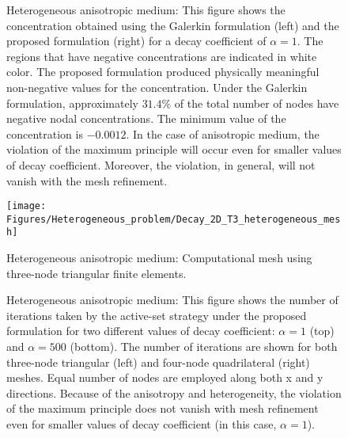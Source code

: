 \documentclass[11pt]{amsart}
\begin{document}
\clearpage
\newpage

\begin{figure}[htbp]
  \centering
\caption{Heterogeneous anisotropic medium: This figure shows the concentration obtained 
      using the Galerkin formulation (left) and the proposed formulation (right) for a decay 
      coefficient of $\alpha = 1$. The regions that have negative concentrations are indicated 
      in white color. The proposed formulation produced physically meaningful non-negative 
      values for the concentration. Under the Galerkin formulation, approximately $31.4\%$ 
      of the total number of nodes have negative nodal concentrations. The minimum value of 
      the concentration is $-0.0012$. In the case of anisotropic medium, the violation 
      of the maximum principle will occur even for smaller values of decay coefficient. 
      Moreover, the violation, in general, will not vanish with the mesh refinement.} 
    \label{Fig:Decay_2D_T3_heterogeneous}
\end{figure}

\begin{figure}[htbp]
  \centering
  \texttt{[image: Figures/Heterogeneous\_problem/Decay\_2D\_T3\_heterogeneous\_mesh]}        
\caption{Heterogeneous anisotropic medium: Computational mesh using three-node 
    triangular finite elements.} \label{Fig:Decay_2D_T3_heterogeneous_mesh}
\end{figure}

\begin{figure}[htbp]
  \centering
\caption{Heterogeneous anisotropic medium: This figure shows the number of iterations 
    taken by the active-set strategy under the proposed formulation for two different 
    values of decay coefficient: $\alpha = 1$ (top) and $\alpha = 500$ (bottom). The 
    number of iterations are shown for both three-node triangular (left) and four-node 
    quadrilateral (right) meshes. Equal number of nodes are employed along both x and y 
    directions. Because of the anisotropy and heterogeneity, the violation of the maximum 
    principle does not vanish with mesh refinement even for smaller values of decay 
    coefficient (in this case, $\alpha = 1$).} 
  \label{Fig:Decay_heterogeneity_iterations_vs_XSeed}
\end{figure}


 
\end{document}
